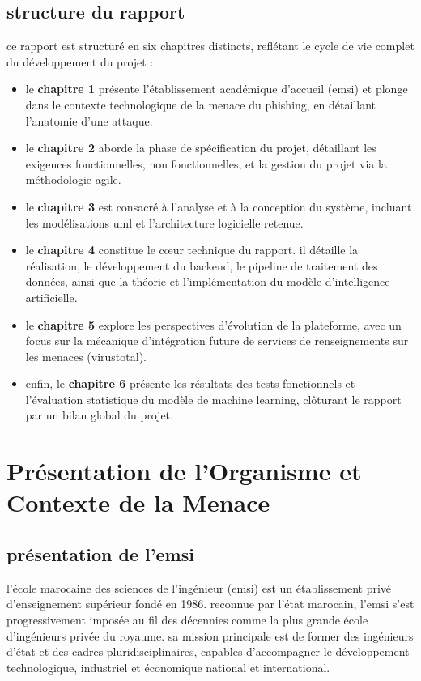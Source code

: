 \documentclass[12pt,a4paper]{report}
\begin{document}
\section*{structure du rapport}
ce rapport est structuré en six chapitres distincts, reflétant le cycle de vie complet du développement du projet :
\begin{itemize}
    \item le \textbf{chapitre 1} présente l'établissement académique d'accueil (emsi) et plonge dans le contexte technologique de la menace du phishing, en détaillant l'anatomie d'une attaque.
    \item le \textbf{chapitre 2} aborde la phase de spécification du projet, détaillant les exigences fonctionnelles, non fonctionnelles, et la gestion du projet via la méthodologie agile.
    \item le \textbf{chapitre 3} est consacré à l'analyse et à la conception du système, incluant les modélisations uml et l'architecture logicielle retenue.
    \item le \textbf{chapitre 4} constitue le cœur technique du rapport. il détaille la réalisation, le développement du backend, le pipeline de traitement des données, ainsi que la théorie et l'implémentation du modèle d'intelligence artificielle.
    \item le \textbf{chapitre 5} explore les perspectives d'évolution de la plateforme, avec un focus sur la mécanique d'intégration future de services de renseignements sur les menaces (virustotal).
    \item enfin, le \textbf{chapitre 6} présente les résultats des tests fonctionnels et l'évaluation statistique du modèle de machine learning, clôturant le rapport par un bilan global du projet.
\end{itemize}


\chapter{Présentation de l'Organisme et Contexte de la Menace}

\section{présentation de l'emsi}
l'école marocaine des sciences de l'ingénieur (emsi) est un établissement privé d'enseignement supérieur fondé en 1986. reconnue par l'état marocain, l'emsi s'est progressivement imposée au fil des décennies comme la plus grande école d'ingénieurs privée du royaume. sa mission principale est de former des ingénieurs d'état et des cadres pluridisciplinaires, capables d'accompagner le développement technologique, industriel et économique national et international.
\end{document}
